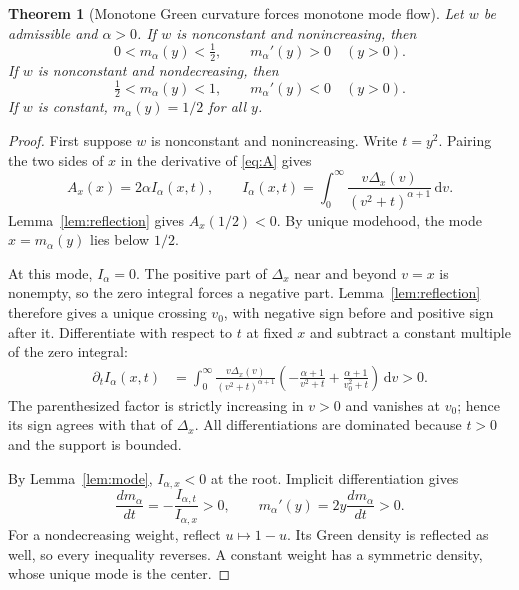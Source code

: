 \documentclass[11pt]{article}
\numberwithin{equation}{section}
\newtheorem{theorem}{Theorem}[section]
\theoremstyle{definition}
\theoremstyle{remark}
\newcommand{\dd}{\,\mathrm d}
\begin{document}
\begin{theorem}[Monotone Green curvature forces monotone mode flow]
\label{thm:modeflow}
Let $w$ be admissible and $\alpha>0$. If $w$ is nonconstant and
nonincreasing, then
\begin{equation}\label{eq:modeflow-downw}
 0<m_\alpha(y)<\tfrac12,\qquad m_\alpha'(y)>0\quad(y>0).
\end{equation}
If $w$ is nonconstant and nondecreasing, then
\begin{equation}\label{eq:modeflow-upw}
 \tfrac12<m_\alpha(y)<1,\qquad m_\alpha'(y)<0\quad(y>0).
\end{equation}
If $w$ is constant, $m_\alpha(y)=1/2$ for all $y$.
\end{theorem}
\begin{proof}
First suppose $w$ is nonconstant and nonincreasing. Write $t=y^2$.
Pairing the two sides of $x$ in the derivative of \eqref{eq:A} gives
\begin{equation}\label{eq:Ialpha}
 A_x(x)=2\alpha I_\alpha(x,t),\qquad
 I_\alpha(x,t)=\int_0^\infty
    \frac{v\Delta_x(v)}{(v^2+t)^{\alpha+1}}\dd v.
\end{equation}
Lemma~\ref{lem:reflection} gives $A_x(1/2)<0$. By unique modehood,
the mode $x=m_\alpha(y)$ lies below $1/2$.

At this mode, $I_\alpha=0$. The positive part of $\Delta_x$ near and
beyond $v=x$ is nonempty, so the zero integral forces a negative part.
Lemma~\ref{lem:reflection} therefore gives a unique crossing $v_0$,
with negative sign before and positive sign after it. Differentiate
with respect to $t$ at fixed $x$ and subtract a constant multiple of
the zero integral:
\begin{align}\label{eq:It-sign}
 \partial_tI_\alpha(x,t)
 &=\int_0^\infty\frac{v\Delta_x(v)}{(v^2+t)^{\alpha+1}}
 \left(-\frac{\alpha+1}{v^2+t}
                +\frac{\alpha+1}{v_0^2+t}\right)\dd v>0.
\end{align}
The parenthesized factor is strictly increasing in $v>0$ and vanishes
at $v_0$; hence its sign agrees with that of $\Delta_x$.
All differentiations are dominated because $t>0$ and the support is
bounded.

By Lemma~\ref{lem:mode}, $I_{\alpha,x}<0$ at the root. Implicit
differentiation gives
\[
 \frac{d m_\alpha}{dt}=-\frac{I_{\alpha,t}}{I_{\alpha,x}}>0,
 \qquad m_\alpha'(y)=2y\frac{d m_\alpha}{dt}>0.
\]
For a nondecreasing weight, reflect $u\mapsto1-u$. Its Green density
is reflected as well, so every inequality reverses. A constant weight
has a symmetric density, whose unique mode is the center.
\end{proof}
\end{document}
